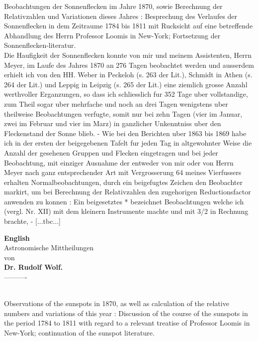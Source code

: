 \documentclass[12pt]{article}
\begin{document}
Beobachtungen der Sonnenflecken im Jahre 1870, sowie Berechnung der Relativzahlen und Variationen dieses Jahres : Besprechung des Verlaufes der Sonnenflecken in dem Zeitraume 1784 bis 1811 mit Rucksicht auf eine betreffende Abhandlung des Herrn Professor Loomis in New-York; Fortsetzung der Sonnenflecken-literatur.\\

Die Haufigkeit der Sonnenflecken konnte von mir und meinem Assistenten, Herrn Meyer, im Laufe des Jahres 1870 an 276 Tagen beobachtet werden und ausserdem erhielt ich von den HH. Weber in Peckeloh (s. 263 der Lit.), Schmidt in Athen (s. 264 der Lit.) und Leppig in Leipzig (s. 265 der Lit.) eine ziemlich grosse Anzahl werthvoller Erganzungen, so dass ich schliesslich fur 352 Tage uber vollstandige, zum Theil sogar uber mehrfache und noch an drei Tagen wenigstens uber theilweise Beobachtungen verfugte, somit nur bei zehn Tagen (vier im Januar, zwei im Februar und vier im Marz) in ganzlicher Unkenntniss uber den Fleckenstand der Sonne blieb. - Wie bei den Berichten uber 1863 bis 1869 habe ich in der ersten der beigegebenen Tafelt fur jeden Tag in altgewohnter Weise die Anzahl der gesehenen Gruppen und Flecken eingetragen und bei jeder Beobachtung, mit einziger Ausnahme der entweder von mir oder von Herrn Meyer nach ganz entsprechender Art mit Vergrosserung 64 meines Vierfussers erhalten Normalbeobachtungen, durch ein beigefugtes Zeichen den Beobachter markirt, um bei Berechnung der Relativzahlen den zugehorigen Reductionsfactor anwenden zu konnen : Ein beigesetztes * bezeichnet Beobachtungen welche ich (vergl. Nr. XII) mit dem kleinern Instrumente machte und mit 3/2 in Rechnung brachte, - [...tbc...]\\


{\centering
\textbf{English}\\
\huge{Astronomische Mittheilungen}\\
\footnotesize{von}\\
\textbf{Dr. Rudolf Wolf.}\\
----------\\
\par
}\\

Observations of the sunspots in 1870, as well as calculation of the relative numbers and variations of this year : Discussion of the course of the sunspots in the period 1784 to 1811 with regard to a relevant treatise of Professor Loomis in New-York; continuation of the sunspot literature.\\
\end{document}
